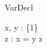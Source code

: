 \begin{zsection}
  \SECTION VarDecl
\end{zsection}

\begin{axdef}
  x, y : \{1\}\\
  z : \power \nat
\where
  x = y \in z
\end{axdef} 
